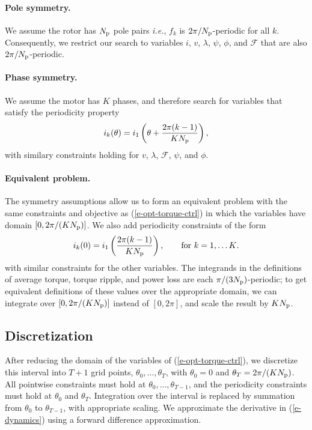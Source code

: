 \documentclass[11pt]{article}
\newcommand{\ie}{{\it i.e.}}
\begin{document}
\paragraph{Pole symmetry.}
We assume the rotor has $N_{\rm p}$ pole pairs
\ie, $f_k$ is $2\pi/N_{\rm p}$-periodic for all $k$.
Consequently, we restrict our search to
variables $i$, $v$, $\lambda$, $\psi$, $\phi$, and $\mathcal F$ that are also
$2\pi/N_{\rm p}$-periodic.

\paragraph{Phase symmetry.} 
We assume the motor has $K$ phases,
and therefore search for variables that satisfy the periodicity property
\[
\label{e-phase-symm-current-periodicity}
i_k(\theta) = i_1 \left(\theta + \frac{2\pi (k-1)}{K N_{\rm p}} \right),
\]
with similary constraints holding for
$v$, $\lambda$, $\mathcal F$, $\psi$, and $\phi$.

\paragraph{Equivalent problem.} 
The symmetry assumptions allow us to form an equivalent problem with 
the same constraints and objective as 
(\ref{e-opt-torque-ctrl})
in which the variables have domain 
$[0,2\pi/(KN_{\rm p})]$.  
We also add periodicity constraints of the form
\[
i_k(0) = i_1 \left(\frac{2\pi (k-1)}{K N_{\rm p}} \right),
\qquad \text{for $k = 1, \ldots K$}.
\]
with similar constraints for the other variables.
The integrands in the definitions of
average torque, torque ripple, and power loss 
are each $\pi/(3N_{\rm p})$-periodic; 
to get equivalent definitions of these values over the appropriate domain,
we can integrate over $[0,2\pi/(KN_{\rm p})]$ instead of $[0,2\pi]$, 
and scale the result by $KN_{\rm p}$.

\subsection{Discretization}
After reducing the domain of the variables of (\ref{e-opt-torque-ctrl}),
we discretize this interval
into $T+1$ grid points, 
$\theta_0,\ldots,\theta_T$, 
with $\theta_0=0$ and $\theta_T = 2\pi/(KN_{\rm p})$.  All
pointwise constraints must hold at $\theta_0,\ldots,\theta_{T-1}$, and
the periodicity constraints 
must hold at $\theta_0$ and $\theta_T$. 
Integration over the interval is replaced by summation from
$\theta_0$ to $\theta_{T-1}$, with appropriate scaling.   
We approximate the derivative in (\ref{e-dynamics}) 
using a forward difference approximation.
\end{document}
